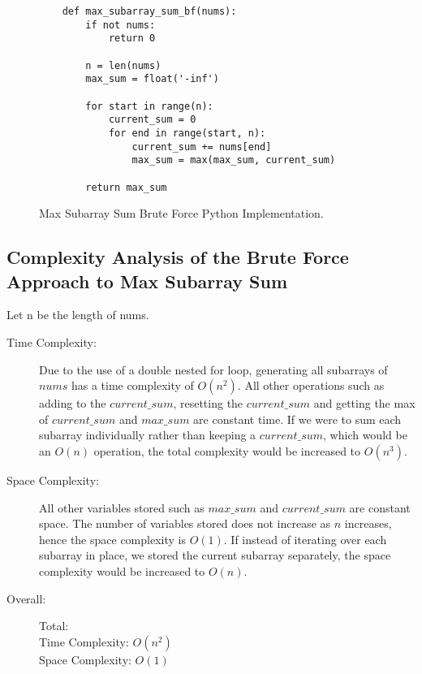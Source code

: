 \begin{figure}[H]
    \centering
    \begin{lstlisting}
    def max_subarray_sum_bf(nums):
        if not nums:
            return 0
    
        n = len(nums)
        max_sum = float('-inf')
    
        for start in range(n):
            current_sum = 0
            for end in range(start, n):
                current_sum += nums[end]
                max_sum = max(max_sum, current_sum)
    
        return max_sum
    \end{lstlisting}
    \caption{Max Subarray Sum Brute Force Python Implementation.}
    \label{fig:max-subarray-sum-bf}
\end{figure}



\subsection{Complexity Analysis of the Brute Force Approach to Max Subarray Sum}\label{subsec:ca-max-subarray-sum-bf}
Let n be the length of nums.
\begin{description}
    \item[Time Complexity:]
        Due to the use of a double nested for loop,
        generating all subarrays of $nums$ has a time complexity of $O(n^2)$.
        All other operations such as adding to the $current\_sum$, resetting the $current\_sum$ and getting the max of $current\_sum$ and $max\_sum$ are constant time.
        If we were to sum each subarray individually rather than keeping a $current\_sum$, which would be an $O(n)$ operation, the total complexity would be increased to $O(n^3)$.

    \item[Space Complexity:] 
        All other variables stored such as $max\_sum$ and $current\_sum$ are constant space.
        The number of variables stored does not increase as $n$ increases, hence the space complexity is $O(1)$.
        If instead of iterating over each subarray in place, we stored the current subarray separately, the space complexity would be increased to $O(n)$.

    \item[Overall:] Total:\\
        Time Complexity: $O(n^2)$\\
        Space Complexity: $O(1)$
    
\end{description}

